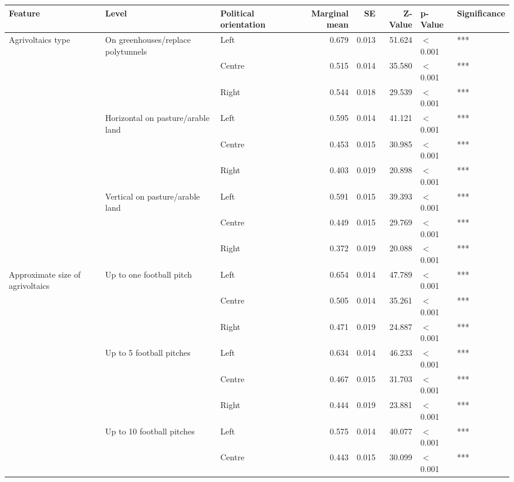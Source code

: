 
\begin{longtable}[t]{>{\raggedright\arraybackslash}p{4cm}>{\raggedright\arraybackslash}p{4cm}>{\raggedright\arraybackslash}p{2.5cm}rrrll}
\toprule
Feature & Level & Political orientation & Marginal mean & SE & Z-Value & p-Value & Significance\\
\midrule
Agrivoltaics type & On greenhouses/replace polytunnels & Left & 0.679 & 0.013 & 51.624 & $<$0.001 & ***\\
\cmidrule{3-8}\nopagebreak
 &  & Centre & 0.515 & 0.014 & 35.580 & $<$0.001 & ***\\
\cmidrule{3-8}\nopagebreak
 &  & Right & 0.544 & 0.018 & 29.539 & $<$0.001 & ***\\
\cmidrule{2-8}\nopagebreak
 & Horizontal on pasture/arable land & Left & 0.595 & 0.014 & 41.121 & $<$0.001 & ***\\
\cmidrule{3-8}\nopagebreak
 &  & Centre & 0.453 & 0.015 & 30.985 & $<$0.001 & ***\\
\cmidrule{3-8}\nopagebreak
 &  & Right & 0.403 & 0.019 & 20.898 & $<$0.001 & ***\\
\cmidrule{2-8}\nopagebreak
 & Vertical on pasture/arable land & Left & 0.591 & 0.015 & 39.393 & $<$0.001 & ***\\
\cmidrule{3-8}\nopagebreak
 &  & Centre & 0.449 & 0.015 & 29.769 & $<$0.001 & ***\\
\cmidrule{3-8}\nopagebreak
 &  & Right & 0.372 & 0.019 & 20.088 & $<$0.001 & ***\\
\cmidrule{1-8}\pagebreak[0]
Approximate size of agrivoltaics & Up to one football pitch & Left & 0.654 & 0.014 & 47.789 & $<$0.001 & ***\\
\cmidrule{3-8}\nopagebreak
 &  & Centre & 0.505 & 0.014 & 35.261 & $<$0.001 & ***\\
\cmidrule{3-8}\nopagebreak
 &  & Right & 0.471 & 0.019 & 24.887 & $<$0.001 & ***\\
\cmidrule{2-8}\nopagebreak
 & Up to 5 football pitches & Left & 0.634 & 0.014 & 46.233 & $<$0.001 & ***\\
\cmidrule{3-8}\nopagebreak
 &  & Centre & 0.467 & 0.015 & 31.703 & $<$0.001 & ***\\
\cmidrule{3-8}\nopagebreak
 &  & Right & 0.444 & 0.019 & 23.881 & $<$0.001 & ***\\
\cmidrule{2-8}\nopagebreak
 & Up to 10 football pitches & Left & 0.575 & 0.014 & 40.077 & $<$0.001 & ***\\
\cmidrule{3-8}\nopagebreak
 &  & Centre & 0.443 & 0.015 & 30.099 & $<$0.001 & ***\\

\end{longtable}
